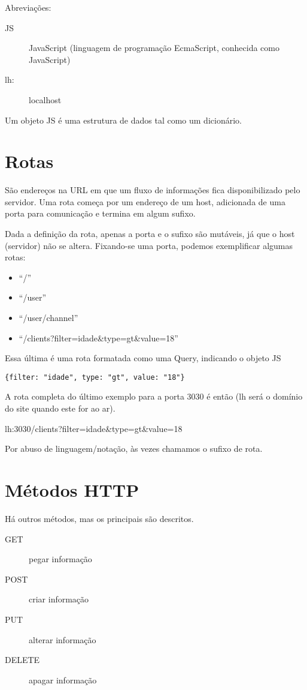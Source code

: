 \documentclass[12pt,a4paper]{article}
\begin{document}
\noindent Abreviações:
\begin{description}
\item[JS] JavaScript (linguagem de programação EcmaScript, conhecida como JavaScript)
\item[lh:] localhost
\end{description}
Um objeto JS é uma estrutura de dados tal como um dicionário.

\section{Rotas}
São endereços na URL em que um fluxo de informações fica
disponibilizado pelo servidor. Uma rota começa por um
endereço de um host, adicionada de uma porta para comunicação
e termina em  algum sufixo. 

Dada a definição da rota, apenas a porta e o sufixo são 
mutáveis, já que o host (servidor) não se altera. Fixando-se uma
porta, podemos exemplificar algumas rotas:
\begin{itemize}
\item ``/''
\item ``/user''
\item ``/user/channel''
\item ``/clients?filter=idade\&type=gt\&value=18''
\end{itemize}
Essa última é uma rota formatada como uma Query, indicando o objeto JS

\verb|{filter: "idade", type: "gt", value: "18"}|

A rota completa do último exemplo para a porta 3030 é então (lh será o domínio do site quando este for ao ar).

lh:3030/clients?filter=idade\&type=gt\&value=18

Por abuso de linguagem/notação, às vezes chamamos o sufixo de rota.



\section{Métodos HTTP}
Há outros métodos, mas os principais são descritos.
\begin{description}
\item[GET] pegar informação

\item[POST] criar informação

\item[PUT] alterar informação

\item[DELETE] apagar informação
\end{description}
\end{document}
